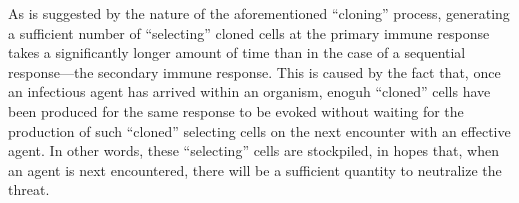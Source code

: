 \documentclass{article}
\begin{document}
As is suggested by the nature of the aforementioned ``cloning'' process,
generating a sufficient number of ``selecting'' cloned cells at the primary
immune response takes a significantly longer amount of time than in the case
of a sequential response---the secondary immune response. This is caused by
the fact that, once an infectious agent has arrived within an organism, enoguh
``cloned'' cells have been produced for the same response to be evoked without
waiting for the production of such ``cloned'' selecting cells on the next
encounter with an effective agent. In other words, these ``selecting'' cells
are stockpiled, in hopes that, when an agent is next encountered, there will be
a sufficient quantity to neutralize the threat.
\end{document}
